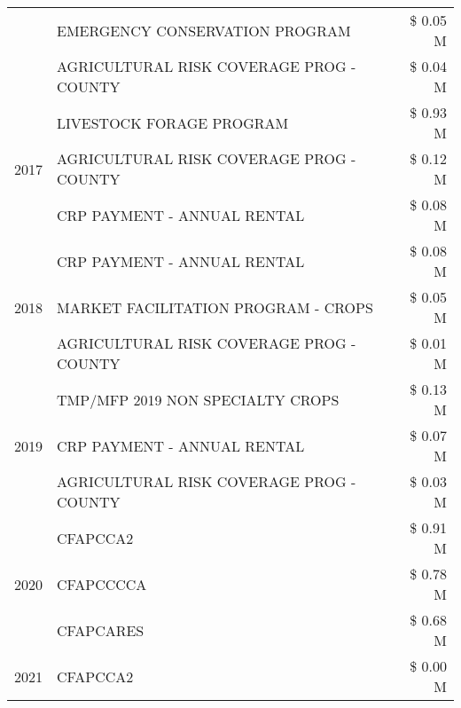 \begin{tabular}{llr}
 & EMERGENCY CONSERVATION PROGRAM & \$ 0.05 M \\
 & AGRICULTURAL RISK COVERAGE PROG - COUNTY & \$ 0.04 M \\
\cline{1-3}
\multirow[t]{3}{*}{2017} & LIVESTOCK FORAGE PROGRAM & \$ 0.93 M \\
 & AGRICULTURAL RISK COVERAGE PROG - COUNTY & \$ 0.12 M \\
 & CRP PAYMENT - ANNUAL RENTAL & \$ 0.08 M \\
\cline{1-3}
\multirow[t]{3}{*}{2018} & CRP PAYMENT - ANNUAL RENTAL & \$ 0.08 M \\
 & MARKET FACILITATION PROGRAM - CROPS & \$ 0.05 M \\
 & AGRICULTURAL RISK COVERAGE PROG - COUNTY & \$ 0.01 M \\
\cline{1-3}
\multirow[t]{3}{*}{2019} & TMP/MFP 2019 NON SPECIALTY CROPS & \$ 0.13 M \\
 & CRP PAYMENT - ANNUAL RENTAL & \$ 0.07 M \\
 & AGRICULTURAL RISK COVERAGE PROG - COUNTY & \$ 0.03 M \\
\cline{1-3}
\multirow[t]{3}{*}{2020} & CFAPCCA2 & \$ 0.91 M \\
 & CFAPCCCCA & \$ 0.78 M \\
 & CFAPCARES & \$ 0.68 M \\
\cline{1-3}
2021 & CFAPCCA2 & \$ 0.00 M \\
\cline{1-3}
\bottomrule
\end{tabular}
